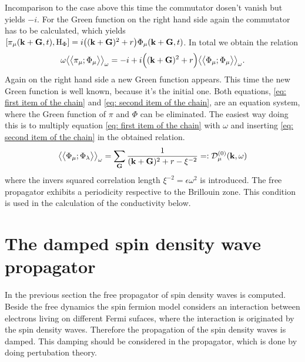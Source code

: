 Incomparison to the case above this time the commutator dosen't vanish but yields $-i$.
For the Green function on the right hand side again the commutator has to be calculated, which yields $\comm{\pi_{\mu}(\vb{k}+\vb{G},t)}{\mt{H}_{\Phi}} = i \big((\vb{k}+\vb{G})^{2} + r\big) \Phi_{\mu}(\vb{k}+\vb{G},t)$.
In total we obtain the relation
%
\begin{align}
	\omega \green{\pi_{\mu}}{\Phi_{\mu}}_{\omega} = 
		-i + i\Big((\vb{k}+\vb{G})^{2} + r \Big) \green{\Phi_{\mu}}{\Phi_{\mu}}_{\omega}.
		\label{eq: second item of the chain}
\end{align}
%
Again on the right hand side a new Green function appears.
This time the new Green function is well known, because it's the initial one.
Both equations, \eqref{eq: first item of the chain} and \eqref{eq: second item of the chain}, are an equation system, where the Green function of $\pi$ and $\Phi$ can be eliminated.
The easiest way doing this is to multiply equation \eqref{eq: first item of the chain} with $\omega$ and inserting \eqref{eq: second item of the chain} in the obtained relation.
%
\begin{align}
	\green{\Phi_{\mu}}{\Phi_{\lambda}}_{\omega} = \sum\limits_{\vb{G}} \frac{1}{(\vb{k}+\vb{G})^{2} + r - \xi^{-2}} =: \mathcal{D}_{\mu}^{(0)}(\vb{k},\omega)
	\label{eq: free spin density wave propagator}
\end{align}
%
where the invers squared correlation length $\xi^{-2} = \epsilon \omega^{2}$ is introduced.
The free propagator exhibits a periodicity respective to the Brillouin zone.
This condition is used in the calculation of the conductivity below. 
%
%
\section{The damped spin density wave propagator}
\label{sec: damped propagator}
%
%
In the previous section the free propagator of spin density waves is computed.
Beside the free dynamics the spin fermion model considers an interaction between electrons living on different Fermi sufaces, where the interaction is originated by the spin density waves.
Therefore the propagation of the spin density waves is damped.
This damping should be considered in the propagator, which is done by doing pertubation theory.

